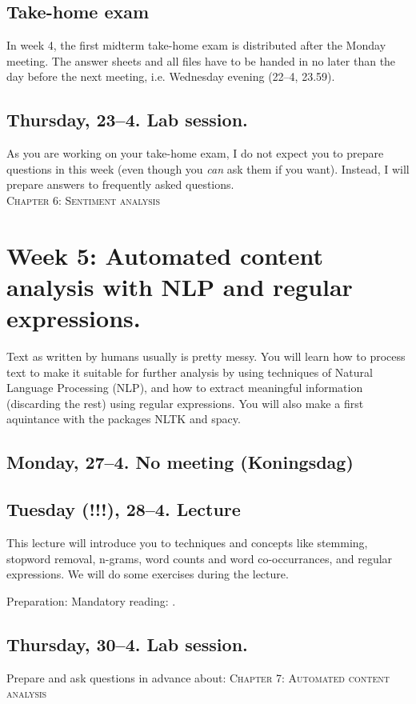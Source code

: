 \subsection*{Take-home exam}
In week 4, the first midterm take-home exam is distributed after the Monday meeting. The answer sheets and all files have to be handed in no later than the day before the next meeting, i.e. Wednesday evening (22--4, 23.59).



\subsection*{Thursday, 23--4. Lab session.}
As you are working on your take-home exam, I do not expect you to prepare questions in this week (even though you \emph{can} ask them if you want). Instead, I will prepare answers to frequently asked questions.\\
\textsc{ Chapter 6: Sentiment analysis}\\




\section*{Week 5: Automated content analysis with NLP and regular expressions.}
Text as written by humans usually is pretty messy. You will learn how to process text to make it suitable for further analysis by using techniques of Natural Language Processing (NLP), and how to extract meaningful information (discarding the rest) using regular expressions. You will also make a first aquintance with the packages NLTK and spacy.


\subsection*{Monday, 27--4. No meeting (Koningsdag)}
\subsection*{Tuesday (!!!), 28--4. Lecture}
This lecture will introduce you to techniques and concepts like stemming, stopword removal, n-grams, word counts and word co-occurrances, and regular expressions. We will do some exercises during the lecture.

Preparation: Mandatory reading: \cite{Boumans2016}. 


\subsection*{Thursday, 30--4. Lab session.}
Prepare and ask questions in advance about:
\textsc{ Chapter 7: Automated content analysis}\\




